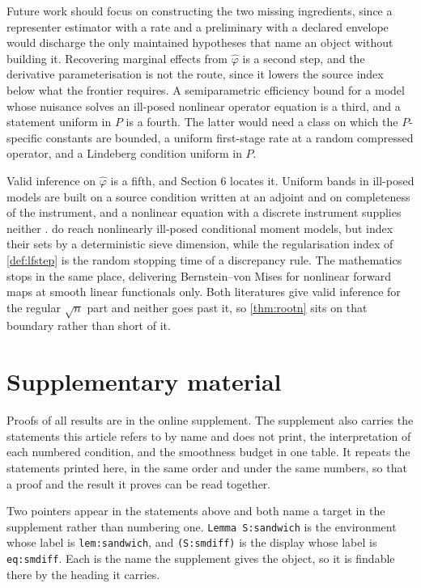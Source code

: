 \documentclass[
  12pt]{article}
\newcommand{\1}[1]{\mathds{1}\left[#1\right]}
\theoremstyle{plain}
\theoremstyle{definition}
\theoremstyle{definition}
\theoremstyle{remark}
\begin{document}
Future work should focus on constructing the two missing ingredients,
since a representer estimator with a rate and a preliminary with a
declared envelope would discharge the only maintained hypotheses that
name an object without building it. Recovering marginal effects from
\(\hat\varphi\) is a second step, and the derivative parameterisation is
not the route, since it lowers the source index below what the frontier
requires. A semiparametric efficiency bound for a model whose nuisance
solves an ill-posed nonlinear operator equation is a third, and a
statement uniform in \(P\) is a fourth. The latter would need a class on
which the \(P\)-specific constants are bounded, a uniform first-stage
rate at a random compressed operator, and a Lindeberg condition uniform
in \(P\).

Valid inference on \(\hat\varphi\) is a fifth, and Section 6 locates it.
Uniform bands in ill-posed models are built on a source condition
written at an adjoint and on completeness of the instrument, and a
nonlinear equation with a discrete instrument supplies neither
\citep[see][]{babii2016,severini2006,babiiflorens2025}.
\citet{chen2012b} do reach nonlinearly ill-posed conditional moment
models, but index their sets by a deterministic sieve dimension, while
the regularisation index of \cref{def:lfstep} is the random stopping
time of a discrepancy rule. The mathematics stops in the same place,
\citet{monardnicklpaternain2021} delivering Bernstein--von Mises for
nonlinear forward maps at smooth linear functionals only. Both
literatures give valid inference for the regular \(\sqrt n\) part and
neither goes past it, so \cref{thm:rootn} sits on that boundary rather
than short of it.

\section{Supplementary material}\label{supplementary-material}

Proofs of all results are in the online supplement. The supplement also
carries the statements this article refers to by name and does not
print, the interpretation of each numbered condition, and the smoothness
budget in one table. It repeats the statements printed here, in the same
order and under the same numbers, so that a proof and the result it
proves can be read together.

Two pointers appear in the statements above and both name a target in
the supplement rather than numbering one. \texttt{Lemma\ S:sandwich} is
the environment whose label is \texttt{lem:sandwich}, and
\texttt{(S:smdiff)} is the display whose label is \texttt{eq:smdiff}.
Each is the name the supplement gives the object, so it is findable
there by the heading it carries.

\clearpage
\small
\printbibliography


\printbibliography
\end{document}

